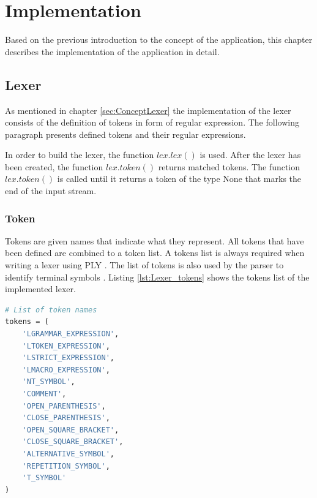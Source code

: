 

\chapter{Implementation}\label{cha:Implementation}

Based on the previous introduction to the concept of the application, this chapter describes the implementation of the application in detail.

\section{Lexer}\label{sec:ImplementationLexer}

As mentioned in chapter \ref{sec:ConceptLexer} the implementation of the lexer consists of the definition of tokens in form of regular expression. The following paragraph presents defined tokens and their regular expressions.

In order to build the lexer, the function $lex.lex()$ is used. After the lexer has been created, the function $lex.token()$ returns matched tokens. The function $lex.token()$ is called until it returns a token of the type None that marks the end of the input stream. 

\subsection{Token}\label{sec:ImplementationLexerToken}

Tokens are given names that indicate what they represent. All tokens that have been defined are combined to a token list.   A tokens list is always required when writing a lexer using \ac{PLY} \cite{PLY}. The list of tokens is also used by the parser to identify terminal symbols \cite{PLY}. Listing \ref{lst:Lexer_tokens} shows the tokens list of the implemented lexer. \\

\begin{lstlisting}[language=Python,basicstyle=\scriptsize	,caption= Lexer tokens,label= lst:Lexer_tokens]
# List of token names
tokens = (
    'LGRAMMAR_EXPRESSION',
    'LTOKEN_EXPRESSION',
    'LSTRICT_EXPRESSION',
    'LMACRO_EXPRESSION',
    'NT_SYMBOL',
    'COMMENT',
    'OPEN_PARENTHESIS',
    'CLOSE_PARENTHESIS',
    'OPEN_SQUARE_BRACKET',
    'CLOSE_SQUARE_BRACKET',
    'ALTERNATIVE_SYMBOL',
    'REPETITION_SYMBOL',
    'T_SYMBOL'
)
\end{lstlisting}

